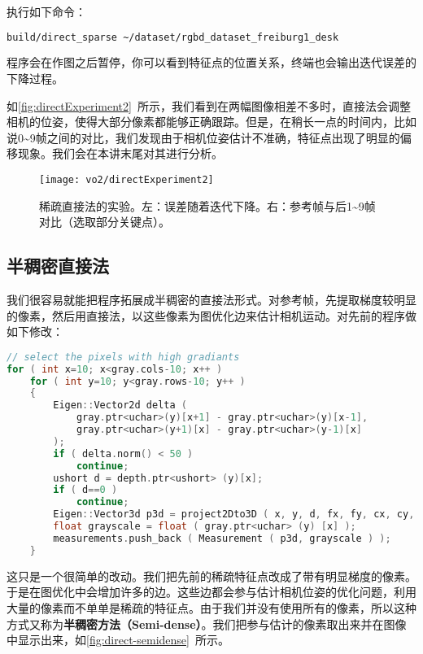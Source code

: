 执行如下命令：
\begin{lstlisting}[language=sh]
build/direct_sparse ~/dataset/rgbd_dataset_freiburg1_desk
\end{lstlisting}

程序会在作图之后暂停，你可以看到特征点的位置关系，终端也会输出迭代误差的下降过程。

如\autoref{fig:directExperiment2}~所示，我们看到在两幅图像相差不多时，直接法会调整相机的位姿，使得大部分像素都能够正确跟踪。但是，在稍长一点的时间内，比如说0\textasciitilde9帧之间的对比，我们发现由于相机位姿估计不准确，特征点出现了明显的偏移现象。我们会在本讲末尾对其进行分析。

\begin{figure}[!htp]
	\centering
	\texttt{[image: vo2/directExperiment2]}
	\caption{稀疏直接法的实验。左：误差随着迭代下降。右：参考帧与后1\textasciitilde9帧对比（选取部分关键点）。}
	\label{fig:directExperiment2}
\end{figure}

\subsection{半稠密直接法}
我们很容易就能把程序拓展成半稠密的直接法形式。对参考帧，先提取梯度较明显的像素，然后用直接法，以这些像素为图优化边来估计相机运动。对先前的程序做如下修改：

\begin{lstlisting}[language=c++,caption=slambook/ch8/direct\_semidense.cpp]
// select the pixels with high gradiants 
for ( int x=10; x<gray.cols-10; x++ )
	for ( int y=10; y<gray.rows-10; y++ )
	{
		Eigen::Vector2d delta (
			gray.ptr<uchar>(y)[x+1] - gray.ptr<uchar>(y)[x-1], 
			gray.ptr<uchar>(y+1)[x] - gray.ptr<uchar>(y-1)[x]
		);
		if ( delta.norm() < 50 )
			continue;
		ushort d = depth.ptr<ushort> (y)[x];
		if ( d==0 )
			continue;
		Eigen::Vector3d p3d = project2Dto3D ( x, y, d, fx, fy, cx, cy, depth_scale );
		float grayscale = float ( gray.ptr<uchar> (y) [x] );
		measurements.push_back ( Measurement ( p3d, grayscale ) );
	}
\end{lstlisting}

这只是一个很简单的改动。我们把先前的稀疏特征点改成了带有明显梯度的像素。于是在图优化中会增加许多的边。这些边都会参与估计相机位姿的优化问题，利用大量的像素而不单单是稀疏的特征点。由于我们并没有使用所有的像素，所以这种方式又称为\textbf{半稠密方法（Semi-dense）}。我们把参与估计的像素取出来并在图像中显示出来，如\autoref{fig:direct-semidense}~所示。

